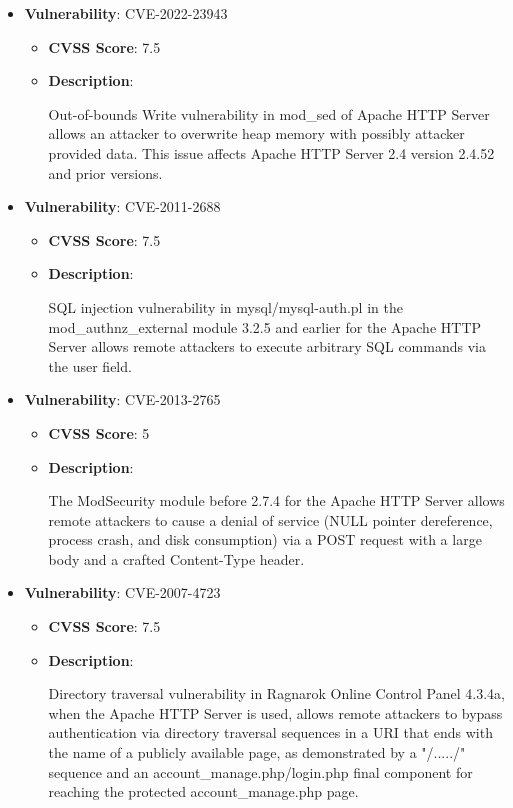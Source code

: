 \documentclass{article}
\begin{document}
\begin{itemize}
        \item \textbf{Vulnerability}: CVE-2022-23943
        \begin{itemize}
            \item \textbf{CVSS Score}:  7.5 
            \item \textbf{Description}:
            \parbox[t]{0.9\linewidth}{
                \ttfamily Out-of-bounds Write vulnerability in mod\_sed of Apache HTTP Server allows an attacker to overwrite heap memory with possibly attacker provided data. This issue affects Apache HTTP Server 2.4 version 2.4.52 and prior versions.
            }
        \end{itemize}
    
        \item \textbf{Vulnerability}: CVE-2011-2688
        \begin{itemize}
            \item \textbf{CVSS Score}:  7.5 
            \item \textbf{Description}:
            \parbox[t]{0.9\linewidth}{
                \ttfamily SQL injection vulnerability in mysql/mysql-auth.pl in the mod\_authnz\_external module 3.2.5 and earlier for the Apache HTTP Server allows remote attackers to execute arbitrary SQL commands via the user field.
            }
        \end{itemize}
    
        \item \textbf{Vulnerability}: CVE-2013-2765
        \begin{itemize}
            \item \textbf{CVSS Score}:  5 
            \item \textbf{Description}:
            \parbox[t]{0.9\linewidth}{
                \ttfamily The ModSecurity module before 2.7.4 for the Apache HTTP Server allows remote attackers to cause a denial of service (NULL pointer dereference, process crash, and disk consumption) via a POST request with a large body and a crafted Content-Type header.
            }
        \end{itemize}
    
        \item \textbf{Vulnerability}: CVE-2007-4723
        \begin{itemize}
            \item \textbf{CVSS Score}:  7.5 
            \item \textbf{Description}:
            \parbox[t]{0.9\linewidth}{
                \ttfamily Directory traversal vulnerability in Ragnarok Online Control Panel 4.3.4a, when the Apache HTTP Server is used, allows remote attackers to bypass authentication via directory traversal sequences in a URI that ends with the name of a publicly available page, as demonstrated by a "/...../" sequence and an account\_manage.php/login.php final component for reaching the protected account\_manage.php page.
            }
        \end{itemize}
    

\end{itemize}
\end{document}
